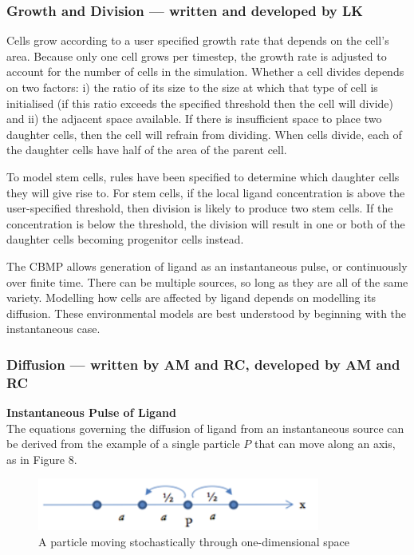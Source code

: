 \documentclass[12pt]{article}
\begin{document}
\subsubsection{Growth and Division --- written and developed by LK}
Cells grow according to a user specified growth rate that depends on the 
cell's area. Because only one cell grows per timestep, the growth rate 
is adjusted to account for the number of cells in the simulation. 
Whether a cell divides depends on two factors: i) the ratio of its size 
to the size at which that type of cell is initialised (if this ratio 
exceeds the specified threshold then the cell will divide) and ii) the 
adjacent space available. If there is insufficient space to place two 
daughter cells, then the cell will refrain from dividing. When cells 
divide, each of the daughter cells have half of the area of the parent 
cell. 

To model stem cells, rules have been specified to determine which 
daughter cells they will give rise to. For stem cells, if the local 
ligand concentration is above the user-specified threshold, then 
division is likely to produce two stem cells. If the concentration is 
below the threshold, the division will result in one or both of the 
daughter cells becoming progenitor cells instead.

The CBMP allows generation of ligand as an instantaneous pulse, or 
continuously over finite time. There can be multiple sources, so long as 
they are all of the same variety. Modelling how cells are affected by 
ligand depends on modelling its diffusion. These environmental 
models are best understood by beginning with the instantaneous case.

\subsubsection{Diffusion --- written by AM and RC, developed by AM and RC}
{\bfseries Instantaneous Pulse of Ligand} \\
The equations governing the diffusion of ligand from an instantaneous 
source can be derived from the example of a single particle \(P\) that can 
move along an axis, as in Figure 8.

\begin{figure}[H]
\centering
\includegraphics[width=9.28cm]{media/particlep.png}
\caption[]{A particle moving stochastically through 
one-dimensional space}
\end{figure}
\end{document}
